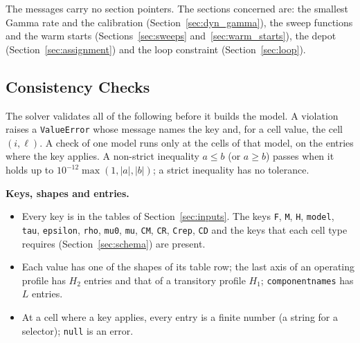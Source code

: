 \documentclass[11pt,a4paper]{article}
\theoremstyle{plain}
\theoremstyle{definition}
\renewcommand{\_}{\textunderscore\allowbreak{}}
\begin{document}
The messages carry no section pointers.
The sections concerned are: the smallest Gamma rate and the calibration (Section~\ref{sec:dyn_gamma}), the sweep functions and the warm starts (Sections~\ref{sec:sweeps} and~\ref{sec:warm_starts}), the depot (Section~\ref{sec:assignment}) and the loop constraint (Section~\ref{sec:loop}).

\subsection{Consistency Checks}\label{sec:consistency_checks}

The solver validates all of the following before it builds the model.
A violation raises a \texttt{ValueError} whose message names the key and, for a cell value, the cell $(i,\ell)$.
A check of one model runs only at the cells of that model, on the entries where the key applies.
A non-strict inequality $a \le b$ (or $a \ge b$) passes when it holds up to $10^{-12}\max(1, |a|, |b|)$; a strict inequality has no tolerance.

\textbf{Keys, shapes and entries.}
\begin{itemize}[leftmargin=1.5em]
  \item Every key is in the tables of Section~\ref{sec:inputs}. The keys \texttt{F}, \texttt{M}, \texttt{H}, \texttt{model}, \texttt{tau}, \texttt{epsilon}, \texttt{rho}, \texttt{mu\_0}, \texttt{mu}, \texttt{C\_M}, \texttt{C\_R}, \texttt{C\_rep}, \texttt{C\_D} and the keys that each cell type requires (Section~\ref{sec:schema}) are present.
  \item Each value has one of the shapes of its table row; the last axis of an operating profile has $H_2$ entries and that of a transitory profile $H_1$; \texttt{component\_names} has $L$ entries.
  \item At a cell where a key applies, every entry is a finite number (a string for a selector); \texttt{null} is an error.
\end{itemize}
\end{document}
